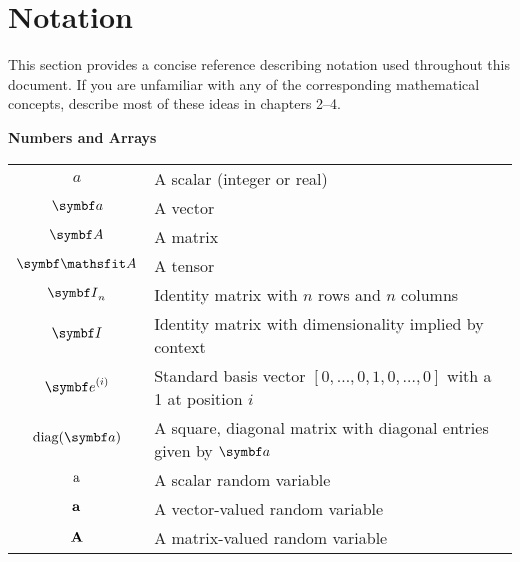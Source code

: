 \chapter*{Notation}
\label{notation}



This section provides a concise reference describing notation used throughout
this document.  If you are unfamiliar with any of the corresponding
mathematical concepts,
describe most of these ideas in chapters
2--4.

\vspace{\notationgap}
\begin{minipage}{0.9\textwidth}
  \centerline{\bf Numbers and Arrays}
  \bgroup
  \def\arraystretch{1.5}
  \begin{tabular}{cp{3.25in}}
    $\displaystyle a$ & A scalar (integer or real)\\
    $\displaystyle \va$ & A vector\\
    $\displaystyle \mA$ & A matrix\\
    $\displaystyle \tA$ & A tensor\\
    $\displaystyle \mI_n$ & Identity matrix with $n$ rows and $n$ columns\\
    $\displaystyle \mI$ & Identity matrix with dimensionality implied by context\\
    $\displaystyle \ve^{(i)}$ & Standard basis vector $[0,\dots,0,1,0,\dots,0]$ with a 1 at position $i$\\
    $\displaystyle \text{diag}(\va)$ & A square, diagonal matrix with diagonal entries given by $\va$\\
    $\displaystyle {\textnormal{a}}$ & A scalar random variable\\
    $\displaystyle {\mathbf{a}}$ & A vector-valued random variable\\
    $\displaystyle {\mathbf{A}}$ & A matrix-valued random variable\\
  \end{tabular}
  \egroup
\end{minipage}

